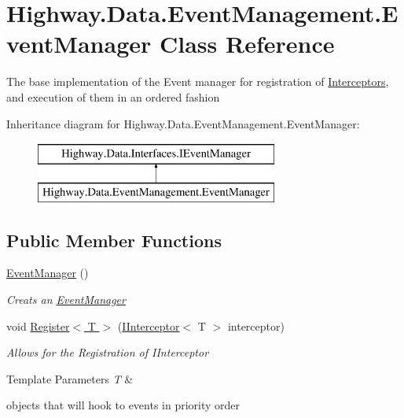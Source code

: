 \hypertarget{class_highway_1_1_data_1_1_event_management_1_1_event_manager}{\section{Highway.\-Data.\-Event\-Management.\-Event\-Manager Class Reference}
\label{class_highway_1_1_data_1_1_event_management_1_1_event_manager}
}


The base implementation of the Event manager for registration of \hyperlink{namespace_highway_1_1_data_1_1_interceptors}{Interceptors}, and execution of them in an ordered fashion  


Inheritance diagram for Highway.\-Data.\-Event\-Management.\-Event\-Manager\-:\begin{figure}[H]
\begin{center}
\leavevmode
\includegraphics[height=2.000000cm]{class_highway_1_1_data_1_1_event_management_1_1_event_manager}
\end{center}
\end{figure}
\subsection*{Public Member Functions}
\begin{DoxyCompactItemize}
\item 
\hyperlink{class_highway_1_1_data_1_1_event_management_1_1_event_manager_a2ff87220e8e54bedff9594688e52163c}{Event\-Manager} ()
\begin{DoxyCompactList}\small\item\em Creats an \hyperlink{class_highway_1_1_data_1_1_event_management_1_1_event_manager}{Event\-Manager} \end{DoxyCompactList}\item 
void \hyperlink{class_highway_1_1_data_1_1_event_management_1_1_event_manager_afef19b17ec8fa17764a1cd24f5569f34}{Register$<$ T $>$} (\hyperlink{interface_highway_1_1_data_1_1_interfaces_1_1_i_interceptor-g}{I\-Interceptor}$<$ T $>$ interceptor)
\begin{DoxyCompactList}\small\item\em Allows for the Registration of I\-Interceptor
\begin{DoxyTemplParams}{Template Parameters}
{\em T} & \\
\hline
\end{DoxyTemplParams}
objects that will hook to events in priority order \end{DoxyCompactList}\end{DoxyCompactItemize}
